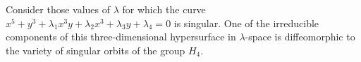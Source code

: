 Consider those values of $\lambda$ for which the curve $x^5 + y^3 + \lambda_1 x^3 y + \lambda_2 x^3 + \lambda_3 y + \lambda_4 = 0$ is singular. One of the irreducible components of this three-dimensional hypersurface in $\lambda$-space is diffeomorphic to the variety of singular orbits of the group $H_4$.
